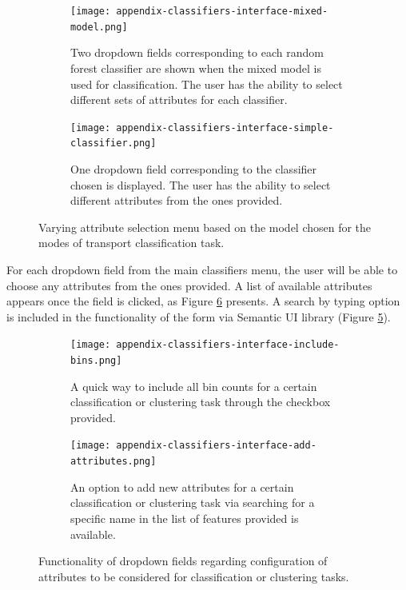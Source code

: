 \documentclass[bsc,frontabs,twoside,singlespacing, parskip,deptreport]{infthesis}     %
\begin{document}
\begin{appendices}
\begin{figure}[h!]
  \begin{subfigure}[t]{\textwidth}
    \texttt{[image: appendix-classifiers-interface-mixed-model.png]}
    \caption{Two dropdown fields corresponding to each random forest classifier are shown when the mixed model is used for classification. The user has the ability to select different sets of attributes for each classifier.}
    \label{fig:mixed-model-interface}
  \end{subfigure}
  \hfill
  \begin{subfigure}[t]{\textwidth}
    \texttt{[image: appendix-classifiers-interface-simple-classifier.png]}
    \caption{One dropdown field corresponding to the classifier chosen is displayed. The user has the ability to select different attributes from the ones provided.}
    \label{fig:simple-classifier-interface}
  \end{subfigure}
  \caption{Varying attribute selection menu based on the model chosen for the modes of transport classification task.}
  \label{fig:classification-interface}
\end{figure}

For each dropdown field from the main classifiers menu, the user will be able to choose any attributes from the ones provided. A list of available attributes appears once the field is clicked, as Figure \ref{fig:attributes-interface} presents. A search by typing option is included in the functionality of the form via Semantic UI library (Figure \ref{fig:add-attributes-interface}).

\begin{figure}[h!]
  \begin{subfigure}[t]{\textwidth}
    \texttt{[image: appendix-classifiers-interface-include-bins.png]}
    \caption{A quick way to include all bin counts for a certain classification or clustering task through the checkbox provided.}
    \label{fig:include-bins-interface}
  \end{subfigure}
  \hfill
  \begin{subfigure}[t]{\textwidth}
    \texttt{[image: appendix-classifiers-interface-add-attributes.png]}
    \caption{An option to add new attributes for a certain classification or clustering task via searching for a specific name in the list of features provided is available.}
    \label{fig:add-attributes-interface}
  \end{subfigure}
  \caption{Functionality of dropdown fields regarding configuration of attributes to be considered for classification or clustering tasks.}
  \label{fig:attributes-interface}
\end{figure}


\end{appendices}
\end{document}
